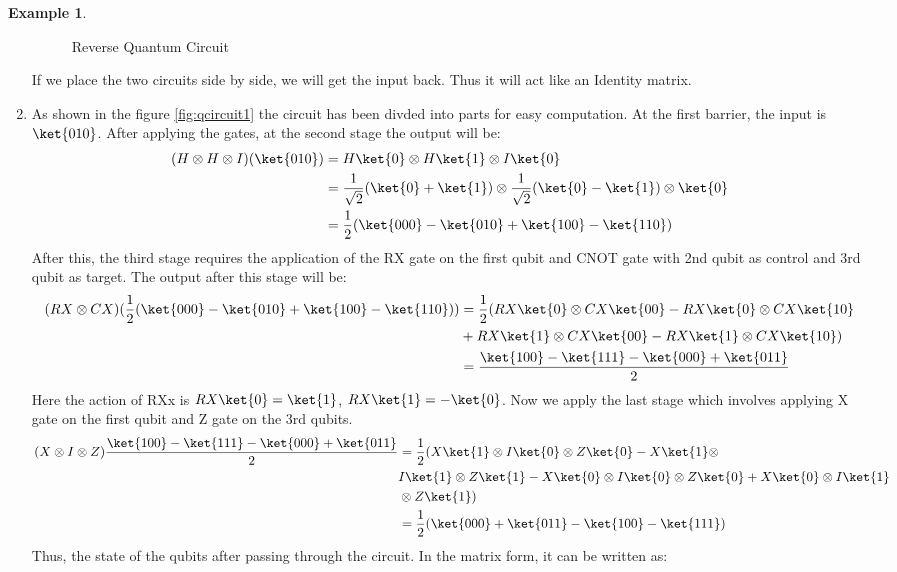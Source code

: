 \documentclass[12pt, oneside]{book}
\theoremstyle{definition}
\theoremstyle{definition}
\newtheorem{example}{Example}[section]
\theoremstyle{remark}
\begin{document}
\begin{example}
\begin{enumerate}
\begin{figure}[H]
            \caption{Reverse Quantum Circuit}
            \label{fig:qcircuit1-rev}
        \end{figure}
        If we place the two circuits side by side, we will get the input back. Thus it will act like an Identity matrix.
        \item As shown in the figure \ref{fig:qcircuit1} the circuit has been divded into parts for easy computation. At the first barrier, the input is $\ket{010}$.
        After applying the gates, at the second stage the output will be:
        \begin{align*}
            (H \otimes H \otimes I)(\ket{010})&=H\ket{0} \otimes H\ket{1}\otimes I\ket{0}\\
            &=\frac{1}{\sqrt{2}}(\ket{0}+\ket{1})\otimes\frac{1}{\sqrt{2}}(\ket{0}-\ket{1})\otimes\ket{0}\\
            &=\frac{1}{2}(\ket{000}-\ket{010}+\ket{100}-\ket{110})
        \end{align*}
        After this, the third stage requires the application of the RX gate on the first qubit and CNOT gate with 2nd qubit as control and 3rd qubit as target.
        The output after this stage will be:
        \begin{align*}
            (RX \otimes CX)(\frac{1}{2}(\ket{000}-\ket{010}+\ket{100}-\ket{110}))&=\frac{1}{2}(RX\ket{0} \otimes CX\ket{00}-RX\ket{0} \otimes CX\ket{10}\\
            &+RX\ket{1}\otimes CX\ket{00}-RX\ket{1}\otimes CX\ket{10})\\
            &=\frac{\ket{100}-\ket{111}-\ket{000}+\ket{011}}{2}
        \end{align*}
        Here the action of RXx is $RX\ket{0}=\ket{1}$, $RX\ket{1}=-\ket{0}$.
        Now we apply the last stage which involves applying X gate on the first qubit and Z gate on the 3rd qubits.
        \begin{align*} 
            (X \otimes I \otimes Z)\frac{\ket{100}-\ket{111}-\ket{000}+\ket{011}}{2}&=\frac{1}{2}(X\ket{1} \otimes I\ket{0} \otimes Z\ket{0}-X\ket{1}\otimes \\
            & I\ket{1}\otimes Z\ket{1}-X\ket{0}\otimes I\ket{0}\otimes Z\ket{0}+X\ket{0}\otimes I\ket{1}\\
            &\otimes Z\ket{1})\\
            &=\frac{1}{2}(\ket{000}+\ket{011}-\ket{100}-\ket{111})
        \end{align*}
        Thus, the state of the qubits after passing through the circuit.
        In the matrix form, it can be written as:

\end{enumerate}
\end{example}
\end{document}

